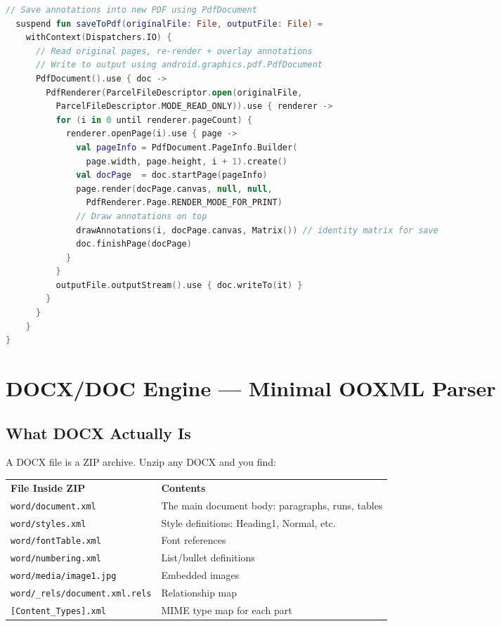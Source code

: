 \documentclass[12pt,a4paper]{report}
\newcommand{\ra}[1]{\renewcommand{\arraystretch}{#1}}
\newcommand{\TH}[1]{\rowcolor{P1}\color{white}\bfseries #1}
\newcommand{\PB}{\newpage}
\begin{document}
\begin{lstlisting}[language=Kotlin,caption={PDF annotation overlay (no library needed)}]
  // Save annotations into new PDF using PdfDocument
  suspend fun saveToPdf(originalFile: File, outputFile: File) =
    withContext(Dispatchers.IO) {
      // Read original pages, re-render + overlay annotations
      // Write to output using android.graphics.pdf.PdfDocument
      PdfDocument().use { doc ->
        PdfRenderer(ParcelFileDescriptor.open(originalFile,
          ParcelFileDescriptor.MODE_READ_ONLY)).use { renderer ->
          for (i in 0 until renderer.pageCount) {
            renderer.openPage(i).use { page ->
              val pageInfo = PdfDocument.PageInfo.Builder(
                page.width, page.height, i + 1).create()
              val docPage  = doc.startPage(pageInfo)
              page.render(docPage.canvas, null, null,
                PdfRenderer.Page.RENDER_MODE_FOR_PRINT)
              // Draw annotations on top
              drawAnnotations(i, docPage.canvas, Matrix()) // identity matrix for save
              doc.finishPage(docPage)
            }
          }
          outputFile.outputStream().use { doc.writeTo(it) }
        }
      }
    }
}
\end{lstlisting}

\PB

\chapter{DOCX/DOC Engine — Minimal OOXML Parser}

\section{What DOCX Actually Is}

A DOCX file is a ZIP archive. Unzip any DOCX and you find:

\begin{center}\ra{1.3}
\begin{tabular}{L{4.0cm} L{9.8cm}}
\TH{File Inside ZIP} & \TH{Contents} \\
 \texttt{word/document.xml} & The main document body: paragraphs, runs, tables \\
 \texttt{word/styles.xml} & Style definitions: Heading1, Normal, etc. \\
 \texttt{word/fontTable.xml} & Font references \\
 \texttt{word/numbering.xml} & List/bullet definitions \\
 \texttt{word/media/image1.jpg} & Embedded images \\
 \texttt{word/\_rels/document.xml.rels} & Relationship map \\
 \texttt{[Content\_Types].xml} & MIME type map for each part \\
\end{tabular}
\end{center}
\end{document}
